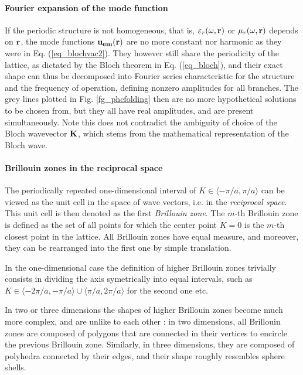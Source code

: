 \paragraph{Fourier expansion of the mode function}%
If the periodic structure is not homogeneous, that is, $\varepsilon_r(\omega,{\mathbf{r}})$ or $\mu_r(\omega,{\mathbf{r}})$ depends on ${\mathbf{r}}$, the mode functions $\mathbf{u_{em}}({\mathbf{r}})$ are no more constant nor harmonic as they were in Eq. (\ref{eq_blochvac2}). They however still share the periodicity of the lattice, as dictated by the Bloch theorem in Eq. (\ref{eq_bloch}), and their exact shape can thus be decomposed into Fourier series
characteristic for the structure and the frequency of operation, defining nonzero amplitudes for all branches. The grey lines plotted in Fig. \ref{fg_phcfolding} then are no more hypothetical solutions to be chosen from, but they all have real amplitudes, and are present simultaneously. 
Note this does not contradict the ambiguity of choice of the Bloch wavevector ${\mathbf{K}}$, which stems from the  mathematical representation of the Bloch wave.

\paragraph{Brillouin zones in the reciprocal space} %
The periodically repeated one-dimensional interval of $K\in\langle-\pi/a, \pi/a\rangle$ can be viewed as the unit cell in the space of wave vectors, i.e. in the \textit{reciprocal space}. This unit cell is then denoted as the first \textit{Brillouin zone}.  
The $m$-th Brillouin zone is defined as the set of all points for which the center point $K=0$ is the $m$-th closest point in the lattice. 
All Brillouin zones have equal measure, and moreover, they can be rearranged into the first one by simple translation. %

In the one-dimensional case the definition of higher Brillouin zones trivially consists in dividing the axis symetrically into equal intervals, such as $K\in\langle-2\pi/a, -\pi/a\rangle \cup \langle \pi/a, 2\pi/a\rangle$ for the second one etc. 

In two or three dimensions the shapes of higher Brillouin zones become much more complex, and are unlike to each other \cite[pp. 134--135]{klingshirn2007semiconductor}: in two dimensions, all Brillouin zones are composed of polygons that are connected in their vertices to encircle the previous Brillouin zone. Similarly, in three dimensions, they are composed of polyhedra connected by their edges, and their shape roughly resembles sphere shells. 

